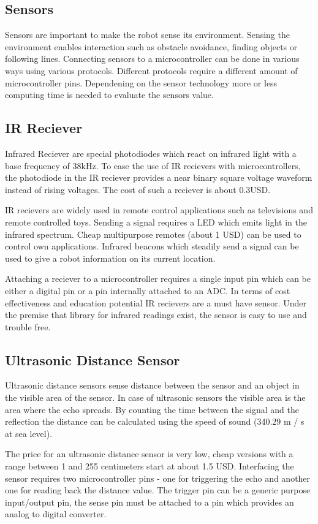 \documentclass[11pt,a4paper]{article}
\begin{document}
\subsection{Sensors}
Sensors are important to make the robot sense its environment. Sensing the environment enables interaction such as obstacle avoidance, finding objects or following lines. Connecting sensors to a microcontroller can be done in various ways using various protocols. Different protocols require a different amount of microcontroller pins. Dependening on the sensor technology more or less computing time is needed to evaluate the sensors value.  

\subsection{IR Reciever}
Infrared Reciever are special photodiodes which react on infrared light with a base frequency of 38kHz. To ease the use of IR recievers with microcontrollers, the photodiode in the IR reciever provides a near binary square voltage waveform instead of rising voltages. The cost of such a reciever is about 0.3USD.

IR recievers are widely used in remote control applications such as televisions and remote controlled toys. Sending a signal requires a LED which emits light in the infrared spectrum. Cheap multipurpose remotes (about 1 USD) can be used to control own applications. Infrared beacons which steadily send a signal can be used to give a robot information on its current location.

Attaching a reciever to a microcontroller requires a single input pin which can be either a digital pin or a pin internally attached to an ADC. In terms of cost effectiveness and education potential IR recievers are a must have sensor. Under the premise that library for infrared readings exist, the sensor is easy to use and trouble free.

\subsection{Ultrasonic Distance Sensor}
Ultrasonic distance sensors sense distance between the sensor and an object in the visible area of the sensor. In case of ultrasonic sensors the visible area is the area where the echo spreads. By counting the time between the signal and the reflection the distance can be calculated using the speed of sound (340.29 m / s at sea level). 

The price for an ultrasonic distance sensor is very low, cheap versions with a range between 1 and 255 centimeters start at about 1.5 USD. Interfacing the sensor requires two microcontroller pins - one for triggering the echo and another one for reading back the distance value. The trigger pin can be a generic purpose input/output pin, the sense pin must be attached to a pin which provides an analog to digital converter.
\end{document}
